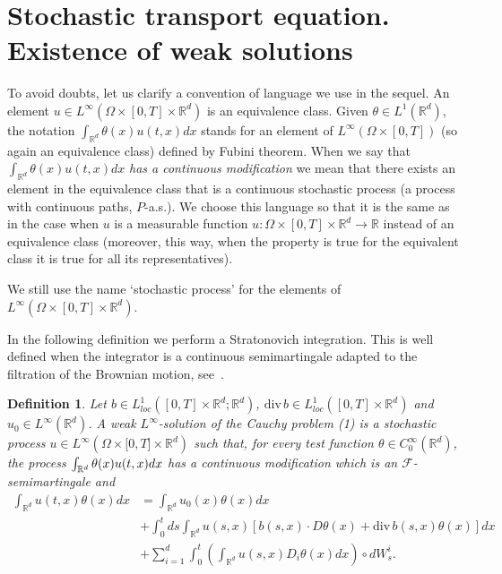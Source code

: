 \documentclass[a4paper,11pt]{article}
\newtheorem{definition}[theorem]{Definition}
\begin{document}
\section{Stochastic transport equation. Existence of weak solutions}

\label{sec:transp}

To avoid doubts, let us clarify a convention of language we use in the
sequel. An element $u\in L^{\infty}( \Omega\times[ 0,T] \times\mathbb{R}%
^{d}) $ is an equivalence class. Given $\theta\in L^{1}( \mathbb{R}^{d}) $,
the notation $\int_{\mathbb{R}^{d}}\theta( x) u( t,x) dx$ stands for an
element of $L^{\infty}( \Omega\times[ 0,T] ) $ (so again an equivalence
class) defined by Fubini theorem. When we say that $\int _{\mathbb{R}%
^{d}}\theta( x) u( t,x) dx$ \textit{has a continuous modification} we mean
that there exists an element in the equivalence class that is a continuous
stochastic process (a process with continuous paths, $P$-a.s.). We choose
this language so that it is the same as in the case when $u$ is a measurable
function $u:\Omega\times[ 0,T] \times\mathbb{R}^{d}\rightarrow\mathbb{R}$
instead of an equivalence class (moreover, this way, when the property is
true for the equivalent class it is true for all its representatives).

We still use the name `stochastic process' for the elements of $L^{\infty }(
\Omega\times[ 0,T] \times\mathbb{R}^{d}) $.

In the following definition we perform a Stratonovich integration. This is
well defined when the integrator is a continuous semimartingale adapted to
the filtration of the Brownian motion, see~\cite{K}.

\begin{definition}
\label{def solution} Let $b\in L_{loc}^{1}([0,T]\times \mathbb{R}^{d};%
\mathbb{R}^{d})$, $\mathrm{div}\,b\in L_{loc}^{1}([0,T]\times \mathbb{R}^{d})
$ and $u_{0}\in L^{\infty }(\mathbb{R}^{d})$. A weak $L^{\infty }$-solution
of the Cauchy problem (1) is a stochastic process $u\in L^{\infty }(\Omega
\times \lbrack 0,T]\times \mathbb{R}^{d})$ such that, for every test
function $\theta \in C_{0}^{\infty }(\mathbb{R}^{d})$, the process $\int_{%
\mathbb{R}^{d}}\theta (x)u(t,x)dx$ has a continuous modification which is an
$\mathcal{F}$-semimartingale and
\begin{align*}
\int_{\mathbb{R}^{d}}u(t,x)\theta (x)dx& =\int_{\mathbb{R}%
^{d}}u_{0}(x)\theta (x)dx \\
& +\int_{0}^{t}ds\int_{\mathbb{R}^{d}}u(s,x)\left[ b(s,x)\cdot D\theta (x)+%
\mathrm{div}\,b(s,x)\theta (x)\right] dx \\
& +\sum_{i=1}^{d}\int_{0}^{t}\left( \int_{\mathbb{R}^{d}}u(s,x)D_{i}\theta
(x) dx\right) \circ dW_{s}^{i}.
\end{align*}
\end{definition}
\end{document}
